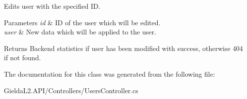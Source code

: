 Edits user with the specified ID. 


\begin{DoxyParams}{Parameters}
{\em id} & ID of the user which will be edited.\\
\hline
{\em user} & New data which will be applied to the user.\\
\hline
\end{DoxyParams}
\begin{DoxyReturn}{Returns}
Backend statistics if user has been modified with success, otherwise 404 if not found.
\end{DoxyReturn}


The documentation for this class was generated from the following file\+:\begin{DoxyCompactItemize}
\item 
Gielda\+L2.\+A\+P\+I/\+Controllers/Users\+Controller.\+cs\end{DoxyCompactItemize}
